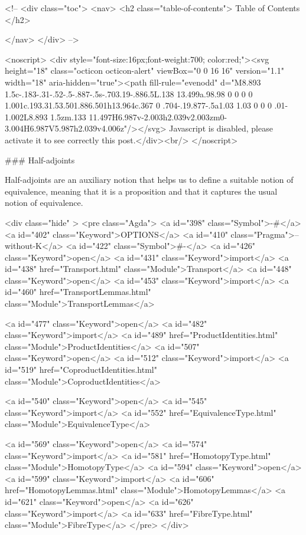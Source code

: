   <!-- 
  <div class="toc">
    <nav>
    <h2 class="table-of-contents"> Table of Contents </h2>
      

    </nav>
  </div>
   -->

  <noscript>
  <div style="font-size:16px;font-weight:700; color:red;"><svg height="18" class="octicon octicon-alert" viewBox="0 0 16 16" version="1.1" width="18" aria-hidden="true"><path fill-rule="evenodd" d="M8.893 1.5c-.183-.31-.52-.5-.887-.5s-.703.19-.886.5L.138 13.499a.98.98 0 0 0 0 1.001c.193.31.53.501.886.501h13.964c.367 0 .704-.19.877-.5a1.03 1.03 0 0 0 .01-1.002L8.893 1.5zm.133 11.497H6.987v-2.003h2.039v2.003zm0-3.004H6.987V5.987h2.039v4.006z"/></svg> Javascript is disabled, please activate it to see correctly this post.</div><br/>
  </noscript>

  ### Half-adjoints

Half-adjoints are an auxiliary notion that helps us to define a suitable notion
of equivalence, meaning that it is a proposition and that it captures the usual
notion of equivalence.

<div class="hide" >
<pre class="Agda">
<a id="398" class="Symbol">{-#</a> <a id="402" class="Keyword">OPTIONS</a> <a id="410" class="Pragma">--without-K</a> <a id="422" class="Symbol">#-}</a>
<a id="426" class="Keyword">open</a> <a id="431" class="Keyword">import</a> <a id="438" href="Transport.html" class="Module">Transport</a>
<a id="448" class="Keyword">open</a> <a id="453" class="Keyword">import</a> <a id="460" href="TransportLemmas.html" class="Module">TransportLemmas</a>

<a id="477" class="Keyword">open</a> <a id="482" class="Keyword">import</a> <a id="489" href="ProductIdentities.html" class="Module">ProductIdentities</a>
<a id="507" class="Keyword">open</a> <a id="512" class="Keyword">import</a> <a id="519" href="CoproductIdentities.html" class="Module">CoproductIdentities</a>

<a id="540" class="Keyword">open</a> <a id="545" class="Keyword">import</a> <a id="552" href="EquivalenceType.html" class="Module">EquivalenceType</a>

<a id="569" class="Keyword">open</a> <a id="574" class="Keyword">import</a> <a id="581" href="HomotopyType.html" class="Module">HomotopyType</a>
<a id="594" class="Keyword">open</a> <a id="599" class="Keyword">import</a> <a id="606" href="HomotopyLemmas.html" class="Module">HomotopyLemmas</a>
<a id="621" class="Keyword">open</a> <a id="626" class="Keyword">import</a> <a id="633" href="FibreType.html" class="Module">FibreType</a>
</pre>
</div>

